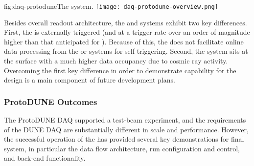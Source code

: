 \begin{dunefigure}{fig:daq-protodune}{The   system.}
  \texttt{[image: daq-protodune-overview.png]}
\end{dunefigure}

Besides overall readout architecture, the  and   systems exhibit two key differences. 
First, the   is externally triggered (and at a trigger rate over an order of magnitude higher than that anticipated for ). Because of this, the   does not facilitate online data processing from the  or  systems for self-triggering. 
Second, the  system sits at the surface with a much higher data occupancy due to cosmic ray activity.
Overcoming the first key difference in order to demonstrate  capability for the   design is a main component of future  development plans.


\subsubsection{ProtoDUNE Outcomes}

The ProtoDUNE DAQ supported a test-beam experiment, and the requirements of the DUNE DAQ are substantially different in scale and performance.
However, the successful operation of the   has provided several key demonstrations for final system, in particular the data flow architecture, run configuration and control, and back-end functionality.

